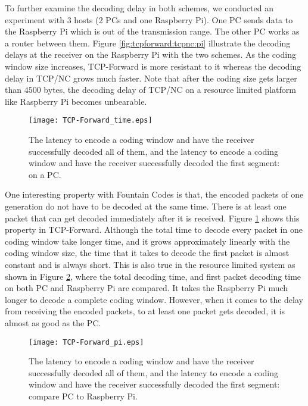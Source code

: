 \documentclass[10pt, conference, final, letterpaper]{IEEEtran}
\theoremstyle{definition}
\begin{document}
To further examine the decoding delay in both schemes, we conducted an experiment with 3 hosts (2 PCs and one Raspberry Pi). One PC sends data to the Raspberry Pi which is out of the transmission range. The other PC works as a router between them. Figure \ref{fig:tcpforward:tcpnc:pi} illustrate the decoding delays at the receiver on the Raspberry Pi with the two schemes. As the coding window size increases, TCP-Forward is more resistant to it whereas the decoding delay in TCP/NC grows much faster. Note that after the coding size gets larger than $4500$ bytes, the decoding delay of TCP/NC on a resource limited platform like Raspberry Pi becomes unbearable.

\begin{figure}[hbt]
	\begin{center}
		\texttt{[image: TCP-Forward\_time.eps]}
	\end{center}
	\caption{The latency to encode a coding window and have the receiver successfully decoded all of them, and the latency to encode a coding window and have the receiver successfully decoded the first segment: on a PC.}
	\label{fig:tcpforward:times}
\end{figure}

One interesting property with Fountain Codes is that, the encoded packets of one generation do not have to be decoded at the same time. There is at least one packet that can get decoded immediately after it is received. Figure \ref{fig:tcpforward:times} shows this property in TCP-Forward. Although the total time to decode every packet in one coding window take longer time, and it grows approximately linearly with the coding window size, the time that it takes to decode the first packet is almost constant and is always short. This is also true in the resource limited system as shown in Figure \ref{fig:tcpforward:pi}, where the total decoding time, and first packet decoding time on both PC and Raspberry Pi are compared. It takes the Raspberry Pi much longer to decode a complete coding window. However, when it comes to the delay from receiving the encoded packets, to at least one packet gets decoded, it is almost as good as the PC.

\begin{figure}[hbt]
	\begin{center}
		\texttt{[image: TCP-Forward\_pi.eps]}
	\end{center}
	\caption{The latency to encode a coding window and have the receiver successfully decoded all of them, and the latency to encode a coding window and have the receiver successfully decoded the first segment: compare PC to Raspberry Pi.}
	\label{fig:tcpforward:pi}
\end{figure}
\end{document}
